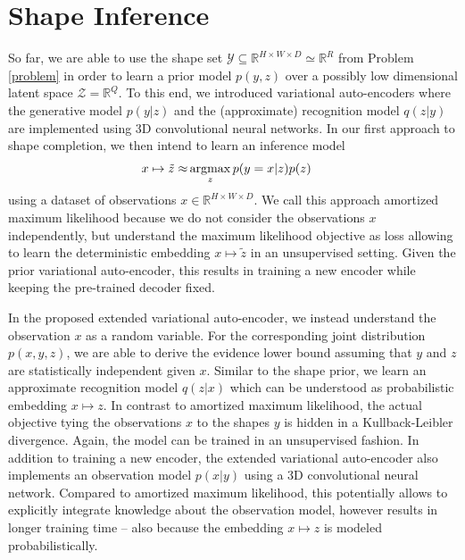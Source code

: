 \chapter{Shape Inference}
\label{ch:shape-inference}

So far, we are able to use the shape set
$\mathcal{Y} \subseteq \mathbb{R}^{H \times W \times D} \simeq \mathbb{R}^R$
from Problem \ref{problem} in order to learn a prior model $p(y,z)$ over a
possibly low dimensional latent space $\mathcal{Z} = \mathbb{R}^Q$. To this end,
we introduced variational auto-encoders where the generative model $p(y | z)$ and
the (approximate) recognition model $q(z | y)$ are implemented using
3D convolutional neural networks. In our first approach
to shape completion, we then intend to learn an inference model
\begin{align}
  x \mapsto \tilde{z} \approx &\operatorname*{argmax}_{z} p(y = x | z) p(z)\label{eq:shape-inference-amortized-ml}
\end{align}
using a dataset of observations $x \in \mathbb{R}^{H \times W \times D}$.
We call this approach amortized maximum likelihood because we do not consider
the observations $x$ independently, but understand the maximum likelihood objective
as loss allowing to learn the deterministic embedding $x \mapsto \tilde{z}$ in an unsupervised
setting. Given the prior variational auto-encoder, this results in training a
new encoder while keeping the pre-trained decoder fixed.

In the proposed extended variational auto-encoder, we instead understand the
observation $x$ as a random variable. For the corresponding joint distribution
$p(x, y, z)$, we are able to derive the evidence lower bound assuming that
$y$ and $z$ are statistically independent given $x$. Similar to the shape prior,
we learn an approximate recognition model $q(z | x)$ which can be understood
as probabilistic embedding $x \mapsto z$. In contrast to amortized maximum likelihood,
the actual objective tying the observations $x$ to the shapes $y$ is
hidden in a Kullback-Leibler divergence. Again, the model can be trained
in an unsupervised fashion. In addition to training a new encoder, the
extended variational auto-encoder also implements an observation model $p(x | y)$ using a 
3D convolutional neural network. Compared to amortized maximum likelihood,
this potentially allows to explicitly integrate knowledge about the observation model,
however results in longer training time -- also because the embedding $x \mapsto z$
is modeled probabilistically.

